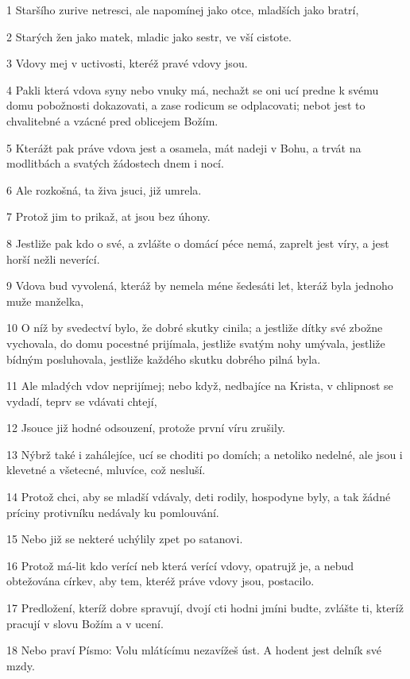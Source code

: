 \par 1 Staršího zurive netresci, ale napomínej jako otce, mladších jako bratrí,
\par 2 Starých žen jako matek, mladic jako sestr, ve vší cistote.
\par 3 Vdovy mej v uctivosti, kteréž pravé vdovy jsou.
\par 4 Pakli která vdova syny nebo vnuky má, nechažt se oni ucí predne k svému domu pobožnosti dokazovati, a zase rodicum se odplacovati; nebot jest to chvalitebné a vzácné pred oblicejem Božím.
\par 5 Kterážt pak práve vdova jest a osamela, mát nadeji v Bohu, a trvát na modlitbách a svatých žádostech dnem i nocí.
\par 6 Ale rozkošná, ta živa jsuci, již umrela.
\par 7 Protož jim to prikaž, at jsou bez úhony.
\par 8 Jestliže pak kdo o své, a zvlášte o domácí péce nemá, zaprelt jest víry, a jest horší nežli neverící.
\par 9 Vdova bud vyvolená, kteráž by nemela méne šedesáti let, kteráž byla jednoho muže manželka,
\par 10 O níž by svedectví bylo, že dobré skutky cinila; a jestliže dítky své zbožne vychovala, do domu pocestné prijímala, jestliže svatým nohy umývala, jestliže bídným posluhovala, jestliže každého skutku dobrého pilná byla.
\par 11 Ale mladých vdov neprijímej; nebo když, nedbajíce na Krista, v chlipnost se vydadí, teprv se vdávati chtejí,
\par 12 Jsouce již hodné odsouzení, protože první víru zrušily.
\par 13 Nýbrž také i zahálejíce, ucí se choditi po domích; a netoliko nedelné, ale jsou i klevetné a všetecné, mluvíce, což nesluší.
\par 14 Protož chci, aby se mladší vdávaly, deti rodily, hospodyne byly, a tak žádné príciny protivníku nedávaly ku pomlouvání.
\par 15 Nebo již se nekteré uchýlily zpet po satanovi.
\par 16 Protož má-lit kdo verící neb která verící vdovy, opatrujž je, a nebud obtežována církev, aby tem, kteréž práve vdovy jsou, postacilo.
\par 17 Predložení, kteríž dobre spravují, dvojí cti hodni jmíni budte, zvlášte ti, kteríž pracují v slovu Božím a v ucení.
\par 18 Nebo praví Písmo: Volu mlátícímu nezavížeš úst. A hodent jest delník své mzdy.
